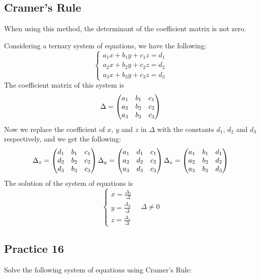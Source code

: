 \documentclass{report}
\begin{document}
\begin{multicols}{2}
  \section{Cramer's Rule}

  When using this method, the determinant of the coefficient matrix is not zero.

  Considering a ternary system of equations, we have the following:
  \[
    \begin{cases}
      a_1x + b_1y + c_1z = d_1 \\
      a_2x + b_2y + c_2z = d_2 \\
      a_3x + b_3y + c_3z = d_3
    \end{cases}
  \]
  The coefficient matrix of this system is
  \[
    \Delta = \begin{pmatrix}
      a_1 & b_1 & c_1 \\
      a_2 & b_2 & c_2 \\
      a_3 & b_3 & c_3
    \end{pmatrix}
  \]
  Now we replace the coefficient of $x$, $y$ and $z$ in $\Delta$ with the
  constants $d_1$, $d_2$ and $d_3$ respectively, and we get the following:
  \[
    \Delta_x = \begin{pmatrix}
      d_1 & b_1 & c_1 \\
      d_2 & b_2 & c_2 \\
      d_3 & b_3 & c_3
    \end{pmatrix}
    \\
    \Delta_y = \begin{pmatrix}
      a_1 & d_1 & c_1 \\
      a_2 & d_2 & c_2 \\
      a_3 & d_3 & c_3
    \end{pmatrix}
    \\
    \Delta_z = \begin{pmatrix}
      a_1 & b_1 & d_1 \\
      a_2 & b_2 & d_2 \\
      a_3 & b_3 & d_3
    \end{pmatrix}
  \]
  The solution of the system of equations is
  \[
    \begin{cases}
      x = \frac{\Delta_x}{\Delta} \\
      y = \frac{\Delta_y}{\Delta} \\
      z = \frac{\Delta_z}{\Delta}
    \end{cases}
    \ \ \ \
    \Delta \neq 0
  \]

  \subsection{Practice 16}

  Solve the following system of equations using Cramer's Rule:

  \begin{enumerate}


\end{enumerate}
\end{multicols}
\end{document}
